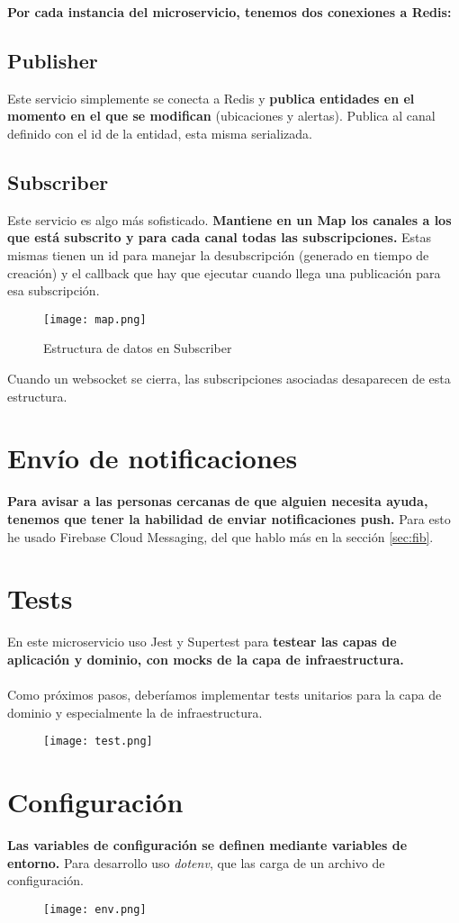 \textbf{Por cada instancia del microservicio, tenemos dos conexiones a Redis:}
\subsection{Publisher}

Este servicio simplemente se conecta a Redis y \textbf{publica entidades en el momento en el que se modifican} (ubicaciones y alertas).
Publica al canal definido con el id de la entidad, esta misma serializada.

\subsection{Subscriber}
Este servicio es algo más sofisticado. \textbf{Mantiene en un Map los canales a los que está subscrito y 
para cada canal todas las subscripciones.} Estas mismas tienen un id para manejar la desubscripción (generado en tiempo de creación) y 
el callback que hay que ejecutar cuando llega una publicación para esa subscripción. 
\begin{figure}[H]
	\centering	
	\texttt{[image: map.png]}
	\caption{Estructura de datos en Subscriber}
	\end{figure}
Cuando un websocket se cierra, las subscripciones asociadas desaparecen de esta estructura.
\section{Envío de notificaciones}\label{sec:fibpre}
\textbf{Para avisar a las personas cercanas de que alguien necesita ayuda, tenemos que tener la habilidad de enviar
notificaciones push.} Para esto he usado Firebase Cloud Messaging, del que hablo más en la sección \ref{sec:fib}.

\section{Tests}\label{sec:tests}
En este microservicio uso Jest y Supertest para \textbf{testear las capas de aplicación y dominio, con mocks de la capa de infraestructura.} \\ \\
Como próximos pasos, deberíamos implementar tests unitarios para la capa de dominio y especialmente la de infraestructura.
\begin{figure}[H]
	\centering	
	\texttt{[image: test.png]}
	\end{figure}

\section{Configuración}\label{sec:config}
\textbf{Las variables de configuración se definen mediante variables de entorno.} Para desarrollo uso \textit{dotenv}, 
que las carga de un archivo de configuración.
\begin{figure}[H]
	\centering	
	\texttt{[image: env.png]}
	\end{figure}

